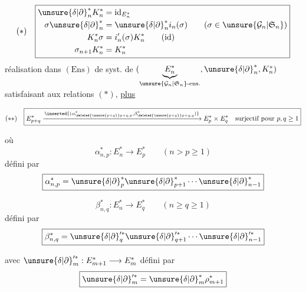 
\[
(*)\quad\boxed{\begin{aligned}
{\unsure{\delta|\partial}}_n^*K_n^*&=\mathrm{id}_{E_n^*}\\
\sigma{\unsure{\delta|\partial}}_n^*&={\unsure{\delta|\partial}}_n^*i_n(\sigma)\qquad(\sigma\in\unsure{\mathcal G_n|\mathfrak S_n})\\
K_n^*\sigma&=i'_n(\sigma)K_n^*\qquad\text{(id)}\\
\sigma_{n+1}K_n^*&=K_n^*
\end{aligned}}
\]
réalisation dans $(\mathrm{Ens})$ de syst. de
$(\underbrace{E_n^*}_{\unsure{\mathcal G_n|\mathfrak S_n}\text{-ens.}},{\unsure{\delta|\partial}}_n^*,K_n^*)$
satisfaisant aux relations $(*)$, \uline{plus}

\[
(**)\quad\boxed{
E_{p+q}^*\xrightarrow{\inserted{(\alpha^*_{\deleted{\unsure{p+q}}p+q,p},\beta^*_{\deleted{\unsure{p+q}}p+q,q})}}E_p^*\times E_q^*
\quad\text{surjectif pour }p,q\geq1}
\]

où
\[
\alpha^*_{n,p}:E_n^*\longrightarrow E_p^*\qquad(n>p\geq1)
\]
défini par
\[
\boxed{\alpha^*_{n,p}={\unsure{\delta|\partial}}_p^*{\unsure{\delta|\partial}}_{p+1}^*\cdots{\unsure{\delta|\partial}}_{n-1}^*}
\]

\[
\beta^*_{n,q}:E_n^*\longrightarrow E_q^*\qquad(n\geq q\geq1)
\]
défini par
\[
\boxed{\beta^*_{n,q}={\unsure{\delta|\partial}}_q^{\prime *}{\unsure{\delta|\partial}}_{q+1}^{\prime *}\cdots{\unsure{\delta|\partial}}_{n-1}^{\prime *}}
\]

avec ${\unsure{\delta|\partial}}_m^{\prime *}:E_{m+1}^*\longrightarrow E_m^*$ défini par
\[
\boxed{{\unsure{\delta|\partial}}_m^{\prime *}={\unsure{\delta|\partial}}_m^*\rho_{m+1}^*}
\]

